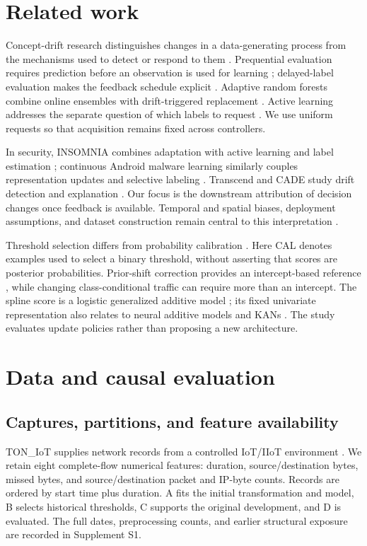 \section{Related work}
Concept-drift research distinguishes changes in a data-generating process from the mechanisms used to detect or respond to them \citep{gama2014}. Prequential evaluation requires prediction before an observation is used for learning \citep{gama2013}; delayed-label evaluation makes the feedback schedule explicit \citep{grzenda2020}. Adaptive random forests combine online ensembles with drift-triggered replacement \citep{gomes2017}. Active learning addresses the separate question of which labels to request \citep{zliobaite2014}. We use uniform requests so that acquisition remains fixed across controllers.

In security, INSOMNIA combines adaptation with active learning and label estimation \citep{andresini2021}; continuous Android malware learning similarly couples representation updates and selective labeling \citep{chen2023}. Transcend and CADE study drift detection and explanation \citep{jordaney2017,yang2021}. Our focus is the downstream attribution of decision changes once feedback is available. Temporal and spatial biases, deployment assumptions, and dataset construction remain central to this interpretation \citep{pendlebury2019,arp2022,sommer2010,engelen2021}.

Threshold selection differs from probability calibration \citep{guo2017}. Here CAL denotes examples used to select a binary threshold, without asserting that scores are posterior probabilities. Prior-shift correction provides an intercept-based reference \citep{saerens2002,lipton2018}, while changing class-conditional traffic can require more than an intercept. The spline score is a logistic generalized additive model \citep{hastie1986}; its fixed univariate representation also relates to neural additive models and KANs \citep{agarwal2021,liu2025}. The study evaluates update policies rather than proposing a new architecture.

\section{Data and causal evaluation}
\subsection{Captures, partitions, and feature availability}
TON\_IoT supplies network records from a controlled IoT/IIoT environment \citep{moustafa2021,booij2022}. We retain eight complete-flow numerical features: duration, source/destination bytes, missed bytes, and source/destination packet and IP-byte counts. Records are ordered by start time plus duration. A fits the initial transformation and model, B selects historical thresholds, C supports the original development, and D is evaluated. The full dates, preprocessing counts, and earlier structural exposure are recorded in Supplement S1.

